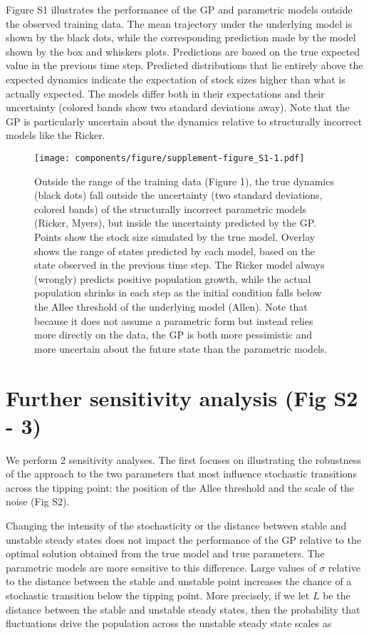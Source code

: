 \documentclass[]{components/elsarticle}
\begin{document}
Figure S1 illustrates the performance of the GP and parametric models
outside the observed training data. The mean trajectory under the
underlying model is shown by the black dots, while the corresponding
prediction made by the model shown by the box and whiskers plots.
Predictions are based on the true expected value in the previous time
step. Predicted distributions that lie entirely above the expected
dynamics indicate the expectation of stock sizes higher than what is
actually expected. The models differ both in their expectations and
their uncertainty (colored bands show two standard deviations away).
Note that the GP is particularly uncertain about the dynamics relative
to structurally incorrect models like the Ricker.

\begin{figure}[htbp]
\centering
\texttt{[image: components/figure/supplement-figure\_S1-1.pdf]}
\caption{Outside the range of the training data (Figure 1), the true
dynamics (black dots) fall outside the uncertainty (two standard
deviations, colored bands) of the structurally incorrect parametric
models (Ricker, Myers), but inside the uncertainty predicted by the GP.
Points show the stock size simulated by the true model. Overlay shows
the range of states predicted by each model, based on the state observed
in the previous time step. The Ricker model always (wrongly) predicts
positive population growth, while the actual population shrinks in each
step as the initial condition falls below the Allee threshold of the
underlying model (Allen). Note that because it does not assume a
parametric form but instead relies more directly on the data, the GP is
both more pessimistic and more uncertain about the future state than the
parametric models.}
\end{figure}

\newpage

\section{Further sensitivity analysis (Fig S2 -
3)}\label{further-sensitivity-analysis-fig-s2---3}

We perform 2 sensitivity analyses. The first focuses on illustrating the
robustness of the approach to the two parameters that most influence
stochastic transitions across the tipping point: the position of the
Allee threshold and the scale of the noise (Fig S2).

Changing the intensity of the stochasticity or the distance between
stable and unstable steady states does not impact the performance of the
GP relative to the optimal solution obtained from the true model and
true parameters. The parametric models are more sensitive to this
difference. Large values of $\sigma$ relative to the distance between
the stable and unstable point increases the chance of a stochastic
transition below the tipping point. More precisely, if we let $L$ be the
distance between the stable and unstable steady states, then the
probability that fluctuations drive the population across the unstable
steady state scales as
\end{document}
